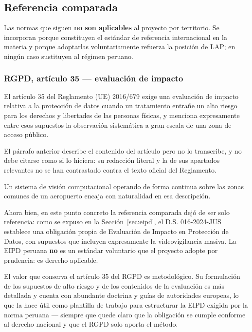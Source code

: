 
\subsection{Referencia comparada}
\label{sec:comparada}

Las normas que siguen \textbf{no son aplicables} al proyecto por
territorio. Se incorporan porque constituyen el estándar de referencia
internacional en la materia y porque adoptarlas voluntariamente refuerza
la posición de LAP; en ningún caso sustituyen al régimen peruano.

\subsubsection{RGPD, artículo 35 --- evaluación de impacto}

El artículo 35 del Reglamento (UE) 2016/679 exige una evaluación de
impacto relativa a la protección de datos cuando un tratamiento entrañe
un alto riesgo para los derechos y libertades de las personas físicas,
y menciona expresamente entre esos supuestos la observación sistemática a
gran escala de una zona de acceso público.

El párrafo anterior describe el contenido del artículo pero no lo
transcribe, y no debe citarse como si lo hiciera: su redacción literal y
la de sus apartados relevantes no se han contrastado contra el texto
oficial del Reglamento.

Un sistema de visión computacional operando de forma continua sobre las
zonas comunes de un aeropuerto encaja con naturalidad en esa descripción.

Ahora bien, en este punto concreto la referencia comparada dejó de ser
solo referencia: como se expuso en la Sección~\ref{sec:eipd}, el D.S.
016-2024-JUS establece una obligación propia de Evaluación de Impacto en
Protección de Datos, con supuestos que incluyen expresamente la
videovigilancia masiva. La EIPD peruana \textbf{no} es un estándar
voluntario que el proyecto adopte por prudencia: es derecho aplicable.

El valor que conserva el artículo 35 del RGPD es metodológico. Su
formulación de los supuestos de alto riesgo y de los contenidos de la
evaluación es más detallada y cuenta con abundante doctrina y guías de
autoridades europeas, lo que la hace útil como plantilla de trabajo para
estructurar la EIPD exigida por la norma peruana --- siempre que quede
claro que la obligación se cumple conforme al derecho nacional y que el
RGPD solo aporta el método.

